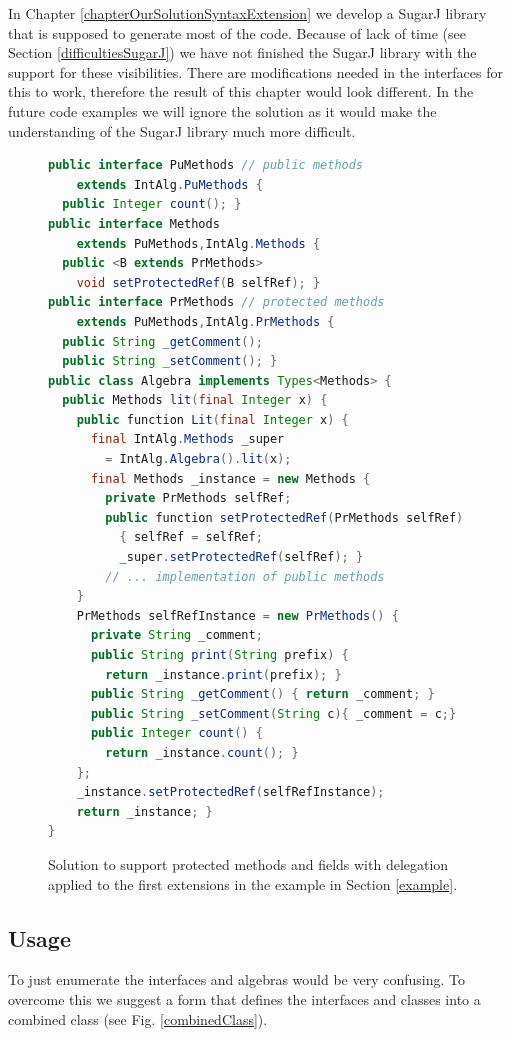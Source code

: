 \documentclass{report}
\begin{document}
In Chapter \ref{chapterOurSolutionSyntaxExtension} we develop a SugarJ library that is supposed to generate most of the code. Because of lack of time (see Section \ref{difficultiesSugarJ}) we have not finished the SugarJ library with the support for these visibilities. There are modifications needed in the interfaces for this to work, therefore the result of this chapter would look different. In the future code examples we will ignore the solution as it would make the understanding of the SugarJ library much more difficult.

\begin{figure}[H]
\begin{lstlisting}[language=java]
public interface PuMethods // public methods
    extends IntAlg.PuMethods {
  public Integer count(); }
public interface Methods
    extends PuMethods,IntAlg.Methods {
  public <B extends PrMethods>
    void setProtectedRef(B selfRef); }
public interface PrMethods // protected methods
    extends PuMethods,IntAlg.PrMethods {
  public String _getComment();
  public String _setComment(); }
public class Algebra implements Types<Methods> {
  public Methods lit(final Integer x) {
    public function Lit(final Integer x) {
      final IntAlg.Methods _super
        = IntAlg.Algebra().lit(x);
      final Methods _instance = new Methods {
        private PrMethods selfRef;
        public function setProtectedRef(PrMethods selfRef)
          { selfRef = selfRef;
          _super.setProtectedRef(selfRef); }
        // ... implementation of public methods
    }
    PrMethods selfRefInstance = new PrMethods() {
      private String _comment;
      public String print(String prefix) {
        return _instance.print(prefix); }
      public String _getComment() { return _comment; }
      public String _setComment(String c){ _comment = c;}
      public Integer count() {
        return _instance.count(); }
    };
    _instance.setProtectedRef(selfRefInstance);
    return _instance; }
}
\end{lstlisting}
\caption{Solution to support protected methods and fields with delegation applied to the first extensions in the example in Section \ref{example}.}
\label{visibilitySupportSolution}
\end{figure}


\subsection{Usage}
\label{combiningTheParts}
To just enumerate the interfaces and algebras would be very confusing. To overcome this we suggest a form that defines the interfaces and classes into a combined class (see Fig. \ref{combinedClass}).
\end{document}
